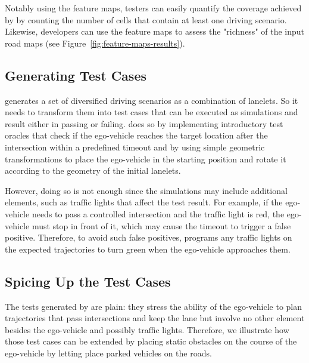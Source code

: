 \documentclass[conference]{IEEEtran}
\begin{document}
Notably using the feature maps, testers can easily quantify the coverage achieved by \tool by counting the number of cells that contain at least one driving scenario. Likewise, developers can use the feature maps to assess the "richness" of the input road maps (see Figure~\ref{fig:feature-maps-results}).






\subsection{Generating Test Cases}
\tool generates a set of diversified driving scenarios as a combination of lanelets. So it needs to transform them into test cases that can be executed as simulations and result either in passing or failing.
\tool does so by implementing introductory test oracles that check if the ego-vehicle reaches the target location after the intersection within a predefined timeout and by using simple geometric transformations to place the ego-vehicle in the starting position and rotate it according to the geometry of the initial lanelets.

However, doing so is not enough since the simulations may include additional elements, such as traffic lights that affect the test result. For example, if the ego-vehicle needs to pass a controlled intersection and the traffic light is red, the ego-vehicle must stop in front of it, which may cause the timeout to trigger a false positive. Therefore, to avoid such false positives, \tool programs any traffic lights on the expected trajectories to turn green when the ego-vehicle approaches them.

\subsection{Spicing Up the Test Cases}
\label{sec:spicing-up}
The tests generated by \tool are plain: they stress the ability of the ego-vehicle to plan trajectories that pass intersections and keep the lane but involve no other element besides the ego-vehicle and possibly traffic lights. 
Therefore, we illustrate how those test cases can be extended by placing static obstacles on the course of the ego-vehicle by letting  \tool place parked vehicles on the roads. 
\end{document}
